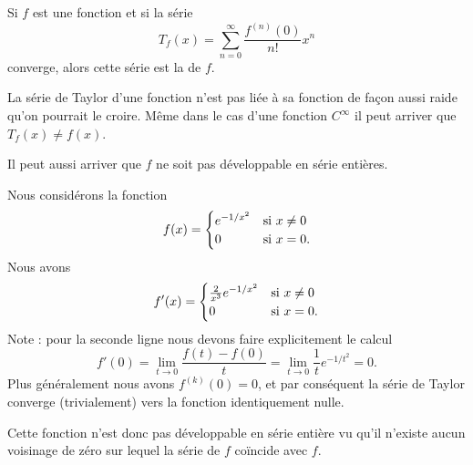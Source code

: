 Si \( f\) est une fonction et si la série
\begin{equation}
    T_f(x)=\sum_{n=0}^{\infty}\frac{ f^{(n)}(0) }{ n! }x^n
\end{equation}
converge, alors cette série est la  de \( f\).

\begin{remark}
    La série de Taylor d'une fonction n'est pas liée à sa fonction de façon aussi raide qu'on pourrait le croire. Même dans le cas d'une fonction \( C^{\infty}\) il peut arriver que \( T_f(x)\neq f(x)\).
    
    Il peut aussi arriver que \( f\) ne soit pas développable en série entières.
\end{remark}

\begin{example}
    Nous considérons la fonction
    \begin{equation}
        f(x)=\begin{cases}
            e^{-1/x^2}    &   \text{si \( x\neq 0\)}\\
            0    &    \text{si \( x=0\).}
        \end{cases}
    \end{equation}
    Nous avons
    \begin{equation}
        f'(x)=\begin{cases}
            \frac{ 2 }{ x^3 } e^{-1/x^2}    &   \text{si \( x\neq 0\)}\\
            0    &    \text{si \( x=0\)}.
        \end{cases}
    \end{equation}
    Note : pour la seconde ligne nous devons faire explicitement le calcul
    \begin{equation}
        f'(0)=\lim_{t\to 0} \frac{ f(t)-f(0) }{ t }=\lim_{t\to 0} \frac{1}{ t } e^{-1/t^2}=0.
    \end{equation}
    Plus généralement nous avons \( f^{(k)}(0)=0\), et par conséquent la série de Taylor converge (trivialement) vers la fonction identiquement nulle.

    Cette fonction n'est donc pas développable en série entière vu qu'il n'existe aucun voisinage de zéro sur lequel la série de \( f\) coïncide avec \( f\).
\end{example}

